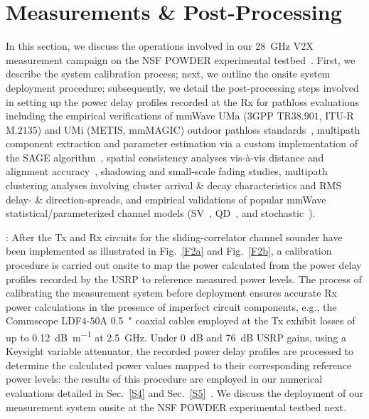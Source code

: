\documentclass[12pt, draftcls, onecolumn]{IEEEtran}
\begin{document}
\section{Measurements \& Post-Processing}\label{S3}
In this section, we discuss the operations involved in our \SI{28}{\giga\hertz} V$2$X measurement campaign on the NSF POWDER experimental testbed~\cite{POWDER}. First, we describe the system calibration process; next, we outline the onsite system deployment procedure; subsequently, we detail the post-processing steps involved in setting up the power delay profiles recorded at the Rx for pathloss evaluations including the empirical verifications of mmWave UMa ($3$GPP TR$38.901$, ITU-R M$.2135$) and UMi (METIS, mmMAGIC) outdoor pathloss standards~\cite{MacCartneyModelsOverview}, multipath component extraction and parameter estimation via a custom implementation of the SAGE algorithm~\cite{SAGE}, spatial consistency analyses vis-\`{a}-vis distance and alignment accuracy~\cite{SpatialConsistencyOriginal}, shadowing and small-scale fading studies, multipath clustering analyses involving cluster arrival \& decay characteristics and RMS delay- \& direction-spreads, and empirical validations of popular mmWave statistical/parameterized channel models (SV~\cite{SV_Molisch}, QD~\cite{QDC_NIST}, and stochastic~\cite{Indoor60G}).

: After the Tx and Rx circuits for the sliding-correlator channel sounder have been implemented as illustrated in Fig.~\ref{F2a} and Fig.~\ref{F2b}, a calibration procedure is carried out onsite to map the power calculated from the power delay profiles recorded by the USRP to reference measured power levels. The process of calibrating the measurement system before deployment ensures accurate Rx power calculations in the presence of imperfect circuit components, e.g., the Commscope LDF$4$-$50$A \SI{0.5}{{"}} coaxial cables employed at the Tx exhibit losses of up to \SI{0.12}{\deci\bel\per\meter} at \SI{2.5}{\giga\hertz}. Under \SI{0}{\deci\bel} and \SI{76}{\deci\bel} USRP gains, using a Keysight variable attenuator, the recorded power delay profiles are processed to determine the calculated power values mapped to their corresponding reference power levels: the results of this procedure are employed in our numerical evaluations detailed in Sec.~\ref{S4} and Sec.~\ref{S5}~\cite{SPAVE_ICC}. We discuss the deployment of our measurement system onsite at the NSF POWDER experimental testbed next.
\end{document}
